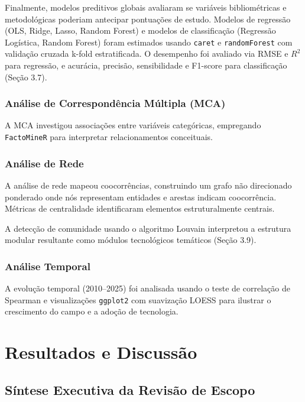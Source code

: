 Finalmente, modelos preditivos globais avaliaram se variáveis bibliométricas e metodológicas poderiam antecipar pontuações de estudo. Modelos de regressão (OLS, Ridge, Lasso, Random Forest) e modelos de classificação (Regressão Logística, Random Forest) foram estimados usando \texttt{caret} e \texttt{randomForest} com validação cruzada k-fold estratificada. O desempenho foi avaliado via RMSE e $R^2$ para regressão, e acurácia, precisão, sensibilidade e F1-score para classificação (Seção 3.7).

\subsubsection{Análise de Correspondência Múltipla (MCA)}

A MCA investigou associações entre variáveis categóricas, empregando \texttt{FactoMineR} para interpretar relacionamentos conceituais.

\subsubsection{Análise de Rede}

A análise de rede mapeou coocorrências, construindo um grafo não direcionado ponderado onde nós representam entidades e arestas indicam coocorrência. Métricas de centralidade identificaram elementos estruturalmente centrais.

A detecção de comunidade usando o algoritmo Louvain  \cite{Blondel2008} interpretou a estrutura modular resultante como módulos tecnológicos temáticos (Seção 3.9).

\subsubsection{Análise Temporal}

A evolução temporal (2010--2025) foi analisada usando o teste de correlação de Spearman  \cite{Spearman1904} e visualizações \texttt{ggplot2} com suavização LOESS  \cite{Cleveland1979} para ilustrar o crescimento do campo e a adoção de tecnologia.

\section{Resultados e Discussão}

\subsection{Síntese Executiva da Revisão de Escopo}

